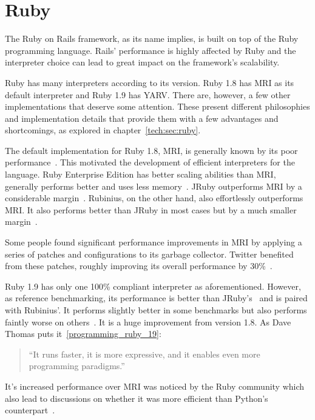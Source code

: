 \section{Ruby} %
\label{state:sec:ruby}
The Ruby on Rails framework, as its name implies, is built on top of the Ruby programming language. Rails' performance is highly affected by Ruby and the interpreter choice can lead to great impact on the framework's scalability.

Ruby has many interpreters according to its version. Ruby 1.8 has MRI as its default interpreter and Ruby 1.9 has YARV. There are, however, a few other implementations that deserve some attention. These present different philosophies and implementation details that provide them with a few advantages and shortcomings, as explored in chapter~\ref{tech:sec:ruby}.

The default implementation for Ruby 1.8, MRI, is generally known by its poor performance~\cite{6tips_for_mri}. This motivated the development of efficient interpreters for the language. Ruby Enterprise Edition has better scaling abilities than MRI, generally performs better and uses less memory~\cite{ree_benchmarks}. JRuby outperforms MRI by a considerable margin~\cite{ruby19_performance}. Rubinius, on the other hand, also effortlessly outperforms MRI. It also performs better than JRuby in most cases but by a much smaller margin~\cite{rvm_rubinius_benchmarks}.

Some people found significant performance improvements in MRI by applying a series of patches and configurations to its garbage collector. Twitter benefited from these patches, roughly improving its overall performance by 30\%~\cite{ruby_gc_tuning}.

Ruby 1.9 has only one 100\% compliant interpreter as aforementioned. However, as reference benchmarking, its performance is better than JRuby's~\cite{ruby19_performance} and is paired with Rubinius'. It performs slightly better in some benchmarks but also performs faintly worse on others~\cite{rvm_rubinius_benchmarks,ruby_interpreter_benchmarks}. It is a huge improvement from version 1.8. As Dave Thomas puts it~\ref{programming_ruby_19}:
\begin{quote}
  ``It runs faster, it is more expressive, and it enables even more programming paradigms.''
\end{quote}
It's increased performance over MRI was noticed by the Ruby community which also lead to discussions on whether it was more efficient than Python's counterpart~\cite{ruby19_python}.


